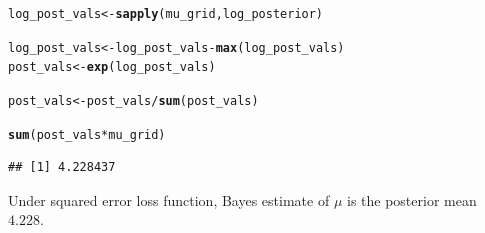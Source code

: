\documentclass[11pt, a4paper]{article}\usepackage[]{graphicx}\usepackage[]{xcolor}
\makeatletter
\newcommand{\hlopt}[1]{\textcolor[rgb]{0,0,0}{#1}}%
\newcommand{\hldef}[1]{\textcolor[rgb]{0.345,0.345,0.345}{#1}}%
\newcommand{\hlkwb}[1]{\textcolor[rgb]{0.69,0.353,0.396}{#1}}%
\newcommand{\hlkwd}[1]{\textcolor[rgb]{0.737,0.353,0.396}{\textbf{#1}}}%
\newenvironment{kframe}{%
 \def\at@end@of@kframe{}%
 \ifinner\ifhmode%
  \def\at@end@of@kframe{\end{minipage}}%
  \begin{minipage}{\columnwidth}%
 \fi\fi%
 \def\FrameCommand##1{\hskip\@totalleftmargin \hskip-\fboxsep
 \colorbox{shadecolor}{##1}\hskip-\fboxsep
     \hskip-\linewidth \hskip-\@totalleftmargin \hskip\columnwidth}%
 \MakeFramed {\advance\hsize-\width
   \@totalleftmargin\z@ \linewidth\hsize
   \@setminipage}}%
 {\par\unskip\endMakeFramed%
 \at@end@of@kframe}
\newenvironment{knitrout}{}{} %
\makeatother
\begin{document}
\begin{itemize}
\begin{knitrout}
\color{fgcolor}\begin{kframe}
\begin{alltt}
\hldef{log_post_vals} \hlkwb{<-} \hlkwd{sapply}\hldef{(mu_grid, log_posterior)}
\end{alltt}
\end{kframe}
\end{knitrout}

\begin{knitrout}
\color{fgcolor}\begin{kframe}
\begin{alltt}
\hldef{log_post_vals} \hlkwb{<-} \hldef{log_post_vals} \hlopt{-} \hlkwd{max}\hldef{(log_post_vals)}
\hldef{post_vals} \hlkwb{<-} \hlkwd{exp}\hldef{(log_post_vals)}
\end{alltt}
\end{kframe}
\end{knitrout}

\begin{knitrout}
\color{fgcolor}\begin{kframe}
\begin{alltt}
\hldef{post_vals} \hlkwb{<-} \hldef{post_vals} \hlopt{/} \hlkwd{sum}\hldef{(post_vals)}
\end{alltt}
\end{kframe}
\end{knitrout}

\begin{knitrout}
\color{fgcolor}\begin{kframe}
\begin{alltt}
\hlkwd{sum}\hldef{(post_vals} \hlopt{*} \hldef{mu_grid)}
\end{alltt}
\begin{verbatim}
## [1] 4.228437
\end{verbatim}
\end{kframe}
\end{knitrout}

Under squared error loss function, Bayes estimate of $\mu$ is the posterior mean $4.228$.

\end{itemize}

\newpage
\end{document}
